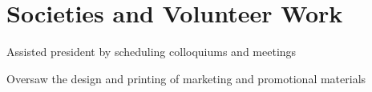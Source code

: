\documentclass[letterpaper]{deedy-resume} %
\begin{document}
\begin{minipage}[t]{0.66\textwidth}









\section{Societies and Volunteer Work}
\begin{tightitemize}
    \item Assisted president by scheduling colloquiums and meetings
    \item Oversaw the design and printing of marketing and promotional materials
\end{tightitemize}


\end{minipage}
\end{document}
